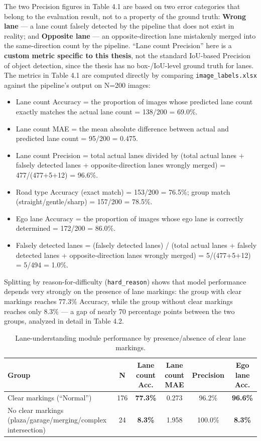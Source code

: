 \documentclass[12pt,a4paper]{report}
\begin{document}
The two Precision figures in Table 4.1 are based on two error categories that belong to the evaluation result, not to a property of the ground truth: \textbf{Wrong lane} --- a lane count falsely detected by the pipeline that does not exist in reality; and \textbf{Opposite lane} --- an opposite-direction lane mistakenly merged into the same-direction count by the pipeline. ``Lane count Precision'' here is a \textbf{custom metric specific to this thesis}, not the standard IoU-based Precision of object detection, since the thesis has no box-/IoU-level ground truth for lanes. The metrics in Table 4.1 are computed directly by comparing \texttt{image\_labels.xlsx} against the pipeline's output on N=200 images:

\begin{itemize}
    \item Lane count Accuracy = the proportion of images whose predicted lane count exactly matches the actual lane count = 138/200 = 69.0\%.
    \item Lane count MAE = the mean absolute difference between actual and predicted lane count = 95/200 = 0.475.
    \item Lane count Precision = total actual lanes divided by (total actual lanes + falsely detected lanes + opposite-direction lanes wrongly merged) = 477/(477+5+12) = 96.6\%.
    \item Road type Accuracy (exact match) = 153/200 = 76.5\%; group match (straight/gentle/sharp) = 157/200 = 78.5\%.
    \item Ego lane Accuracy = the proportion of images whose ego lane is correctly determined = 172/200 = 86.0\%.
    \item Falsely detected lanes = (falsely detected lanes) / (total actual lanes + falsely detected lanes + opposite-direction lanes wrongly merged) = 5/(477+5+12) = 5/494 = 1.0\%.
\end{itemize}

Splitting by reason-for-difficulty (\texttt{hard\_reason}) shows that model performance depends very strongly on the presence of lane markings: the group with clear markings reaches 77.3\% Accuracy, while the group without clear markings reaches only 8.3\% --- a gap of nearly 70 percentage points between the two groups, analyzed in detail in Table 4.2.

\begin{table}[htbp]
    \centering
    \small
    \caption{Lane-understanding module performance by presence/absence of clear lane markings.}
    \label{tab:4.2}
    \begin{tabularx}{\linewidth}{@{}Xcccc c@{}}
        \toprule
        \textbf{Group} & \textbf{N} & \textbf{Lane count Acc.} & \textbf{Lane count MAE} & \textbf{Precision} & \textbf{Ego lane Acc.} \\
        \midrule
        Clear markings (``Normal'') & 176 & \textbf{77.3\%} & 0.273 & 96.2\% & \textbf{96.6\%} \\
        No clear markings (plaza/garage/merging/complex intersection) & 24 & \textbf{8.3\%} & 1.958 & 100.0\% & \textbf{8.3\%} \\
        \bottomrule
    \end{tabularx}
\end{table}
\end{document}
